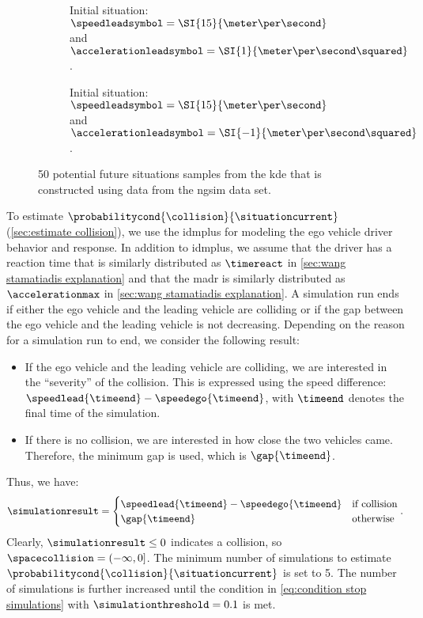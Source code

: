 \setlength{\figurewidth}{.49\linewidth}
\setlength{\figureheight}{.7\figurewidth}
\begin{figure}
	\centering
	\begin{subfigure}{.49\linewidth}
		\centering
		
		\caption{Initial situation: $\speedleadsymbol=\SI{15}{\meter\per\second}$ and $\accelerationleadsymbol=\SI{1}{\meter\per\second\squared}$.}
		\label{fig:speed profiles accelerating}
	\end{subfigure}
	\begin{subfigure}{.49\linewidth}
		\centering
		
		\caption{Initial situation: $\speedleadsymbol=\SI{15}{\meter\per\second}$ and $\accelerationleadsymbol=\SI{-1}{\meter\per\second\squared}$.}
		\label{fig:speed profiles decelerating}
	\end{subfigure}
	\caption{50 potential future situations samples from the \ac{kde} that is constructed using data from the \ac{ngsim} data set.}
	\label{fig:speed profiles}
\end{figure}

To estimate $\probabilitycond{\collision}{\situationcurrent}$ (\cref{sec:estimate collision}), we use the \ac{idmplus} \autocite{schakel2010effects} for modeling the ego vehicle driver behavior and response.
In addition to \ac{idmplus}, we assume that the driver has a reaction time that is similarly distributed as $\timereact$ in \cref{sec:wang stamatiadis explanation} and that the \ac{madr} is similarly distributed as $\accelerationmax$ in \cref{sec:wang stamatiadis explanation}.
\cstartb A simulation run ends if either the ego vehicle and the leading vehicle are colliding or if the gap between the ego vehicle and the leading vehicle is not decreasing. 
Depending on the reason for a simulation run to end, we consider the following result:
\begin{itemize}
	\item If the ego vehicle and the leading vehicle are colliding, we are interested in the ``severity'' of the collision. 
	This is expressed using the speed difference: $\speedlead{\timeend} - \speedego{\timeend}$, with $\timeend$ denotes the final time of the simulation.
	\item If there is no collision, we are interested in how close the two vehicles came.
	Therefore, the minimum gap is used, which is $\gap{\timeend}$.
\end{itemize}
Thus, we have: \cendb
\begin{equation}
	\simulationresult = \begin{cases}
		\speedlead{\timeend} - \speedego{\timeend} & \text{if collision} \\
		\gap{\timeend} & \text{otherwise}
	\end{cases}.
\end{equation}
Clearly, $\simulationresult\leq0$ indicates a collision, so $\spacecollision=(-\infty, 0]$.
\cstarta The minimum number of simulations to estimate $\probabilitycond{\collision}{\situationcurrent}$ is set to 5. 
The number of simulations is further increased until the condition in \cref{eq:condition stop simulations} with $\simulationthreshold=0.1$ is met. \cenda

